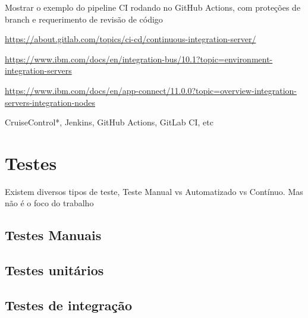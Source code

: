 Mostrar o exemplo do pipeline CI rodando no GitHub Actions, com proteções de branch e requerimento de revisão de código

\url{https://about.gitlab.com/topics/ci-cd/continuous-integration-server/}

\url{https://www.ibm.com/docs/en/integration-bus/10.1?topic=environment-integration-servers}

\url{https://www.ibm.com/docs/en/app-connect/11.0.0?topic=overview-integration-servers-integration-nodes}

CruiseControl*, Jenkins, GitHub Actions, GitLab CI, etc


\section{Testes}
Existem diversos tipos de teste, Teste Manual vs Automatizado vs Contínuo. Mas não é o foco do trabalho

\subsection{Testes Manuais}
\subsection{Testes unitários}
\subsection{Testes de integração}

